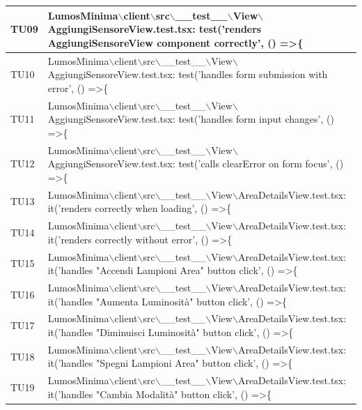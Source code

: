 \documentclass[12pt]{article}
\begin{document}
\begin{xltabular}{\linewidth}{|>{\hsize}X|X|}
	TU09 & LumosMinima$\backslash$client$\backslash$src$\backslash$\_\_test\_\_$\backslash$View$\backslash$AggiungiSensoreView.test.tsx: test('renders AggiungiSensoreView component correctly', () =\textgreater \{ \\ \hline
	TU10 & LumosMinima$\backslash$client$\backslash$src$\backslash$\_\_test\_\_$\backslash$View$\backslash$AggiungiSensoreView.test.tsx: test('handles form submission with error', () =\textgreater \{ \\ \hline
	TU11 & LumosMinima$\backslash$client$\backslash$src$\backslash$\_\_test\_\_$\backslash$View$\backslash$AggiungiSensoreView.test.tsx: test('handles form input changes', () =\textgreater \{ \\ \hline
	TU12 & LumosMinima$\backslash$client$\backslash$src$\backslash$\_\_test\_\_$\backslash$View$\backslash$AggiungiSensoreView.test.tsx: test('calls clearError on form focus', () =\textgreater \{ \\ \hline
	TU13 & LumosMinima$\backslash$client$\backslash$src$\backslash$\_\_test\_\_$\backslash$View$\backslash$AreaDetailsView.test.tsx: it('renders correctly when loading', () =\textgreater \{ \\ \hline
	TU14 & LumosMinima$\backslash$client$\backslash$src$\backslash$\_\_test\_\_$\backslash$View$\backslash$AreaDetailsView.test.tsx: it('renders correctly without error', () =\textgreater \{ \\ \hline
	TU15 & LumosMinima$\backslash$client$\backslash$src$\backslash$\_\_test\_\_$\backslash$View$\backslash$AreaDetailsView.test.tsx: it('handles "Accendi Lampioni Area" button click', () =\textgreater \{ \\ \hline
	TU16 & LumosMinima$\backslash$client$\backslash$src$\backslash$\_\_test\_\_$\backslash$View$\backslash$AreaDetailsView.test.tsx: it('handles "Aumenta Luminosità" button click', () =\textgreater \{ \\ \hline
	TU17 & LumosMinima$\backslash$client$\backslash$src$\backslash$\_\_test\_\_$\backslash$View$\backslash$AreaDetailsView.test.tsx: it('handles "Diminuisci Luminosità" button click', () =\textgreater \{ \\ \hline
	TU18 & LumosMinima$\backslash$client$\backslash$src$\backslash$\_\_test\_\_$\backslash$View$\backslash$AreaDetailsView.test.tsx: it('handles "Spegni Lampioni Area" button click', () =\textgreater \{ \\ \hline
	TU19 & LumosMinima$\backslash$client$\backslash$src$\backslash$\_\_test\_\_$\backslash$View$\backslash$AreaDetailsView.test.tsx: it('handles "Cambia Modalità" button click', () =\textgreater \{ \\ \hline

\end{xltabular}
\end{document}
